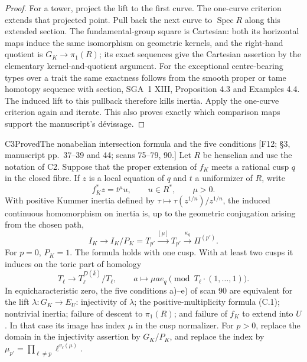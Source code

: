 \begin{proof}
For a tower, project the lift to the first curve. The one-curve criterion
extends that projected point. Pull back the next curve to $\operatorname{Spec}R$
along this extended section. The fundamental-group square is Cartesian:
both its horizontal maps induce the same isomorphism on geometric kernels,
and the right-hand quotient is $G_K\to\pi_1(R)$; its exact sequences give
the Cartesian assertion by the elementary kernel-and-quotient argument.
For the exceptional centre-bearing types over a trait the same exactness
follows from the smooth proper or tame homotopy sequence with section,
SGA~1 XIII, Proposition 4.3 and Examples 4.4. The induced lift to this
pullback therefore kills inertia. Apply the one-curve criterion again and
iterate. This also proves exactly which comparison maps support the
manuscript's d\'evissage.
\end{proof}

\begin{result}{C3}{Proved}{The nonabelian intersection formula and the five conditions}
\textup{[F12; \S3, manuscript pp.\ 37--39 and 44; scans 75--79, 90.]}
Let $R$ be henselian and use the notation of C2. Suppose that the proper
extension of $f_K$ meets a rational cusp $q$ in the closed fibre. If $z$ is
a local equation of $q$ and $t$ a uniformizer of $R$, write
\[
 f_K^*z=t^\mu u,\qquad u\in R^*,\qquad \mu>0.
\]
With positive Kummer inertia defined by
$\tau\mapsto\tau(z^{1/n})/z^{1/n}$, the induced continuous homomorphism on
inertia is, up to the geometric conjugation arising from the chosen path,
\[
 I_K\longrightarrow I_K/P_K=T_{p'}
       \xrightarrow{[\mu]}T_{p'}\xrightarrow{\kappa_q}\Pi^{(p')}.
 \tag{C.1}
\]
For $p=0$, $P_K=1$. The formula holds with one cusp. With at least two
cusps it induces on the toric part of homology
\[
 T_\ell\longrightarrow T_\ell^{D(\bar k)}/T_\ell,
 \qquad a\longmapsto\mu a e_q \pmod{T_\ell\cdot(1,\ldots,1)}.
 \tag{C.2}
\]
In equicharacteristic zero, the five conditions a)--e) of scan 90 are
equivalent for the lift $\lambda:G_K\to E_U$: injectivity of $\lambda$;
the positive-multiplicity formula (C.1); nontrivial inertia; failure of
descent to $\pi_1(R)$; and failure of $f_K$ to extend into $U$. In that
case its image has index $\mu$ in the cusp normalizer. For $p>0$, replace
the domain in the injectivity assertion by $G_K/P_K$, and replace the
index by
$\mu_{p'}=\prod_{\ell\ne p}\ell^{v_\ell(\mu)}$.
\end{result}

